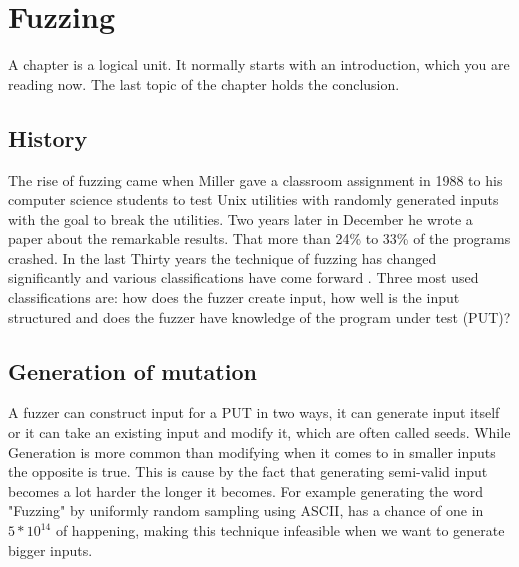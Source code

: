 \chapter{Fuzzing}
\label{cha:1}
A chapter is a logical unit. It normally starts with an introduction, which
you are reading now. The last topic of the chapter holds the conclusion.

%


\section{History}
The rise of fuzzing came when Miller gave a classroom assignment \cite{FuzzingAssignment} in 1988 to his computer science students to test Unix utilities with randomly generated inputs with the goal to break the utilities. Two years later in December he wrote a paper \cite{originalFuzzingUnixUtils} about the remarkable results. That more than 24\% to 33\% of the programs crashed.
In the last Thirty years the technique of fuzzing has changed significantly and various classifications have come forward \cite{12Fuzzingasurvey} \cite{13manes2019survey}. Three most used classifications are: 
how does the fuzzer create input, how well is the input structured and does the fuzzer have knowledge of the program under test (PUT)?



\section{Generation of mutation}
A fuzzer can construct input for a PUT in two ways, it can generate input itself or it can take an existing input and modify it, which are often called seeds. While Generation is more common than modifying when it comes to in smaller inputs the opposite is true. This is cause by the fact that generating semi-valid input becomes a lot harder the longer it becomes. For example generating the word "Fuzzing" by uniformly random sampling using ASCII, has a chance of one in $5*10^{14}$ of happening, making this technique infeasible when we want to generate bigger inputs.

